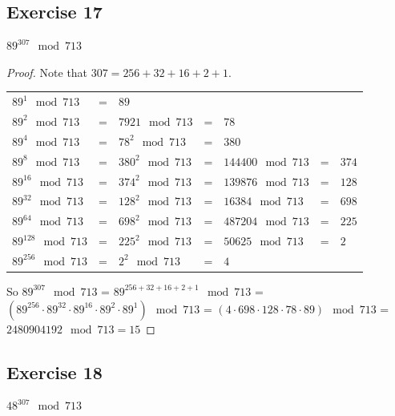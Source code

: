 \documentclass[14pt]{extarticle}
\begin{document}
\subsection{Exercise 17}
\(89^{307} \mod 713\)

\begin{proof}
Note that \(307 = 256 + 32 + 16 + 2 + 1\).

\begin{tabular}{lclclcl}
\(89^1 \mod 713\) & = & \(89\) \\
\(89^2 \mod 713\) & = & \(7921 \mod 713\) & = & \(78\)\\
\(89^4 \mod 713\) & = & \(78^2 \mod 713\) & = & \(380\) \\
\(89^8 \mod 713\) & = & \(380^2 \mod 713\) & = & \(144400 \mod 713\) & = & \(374\) \\
\(89^{16} \mod 713\) & = & \(374^2 \mod 713\) & = & \(139876 \mod 713\) & = & \(128\) \\
\(89^{32} \mod 713\) & = & \(128^2 \mod 713\) & = & \(16384 \mod 713\) & = & \(698\) \\
\(89^{64} \mod 713\) & = & \(698^2 \mod 713\) & = & \(487204 \mod 713\) & = & \(225\) \\
\(89^{128} \mod 713\) & = & \(225^2 \mod 713\) & = & \(50625 \mod 713\) & = & \(2\) \\
\(89^{256} \mod 713\) & = & \(2^2 \mod 713\) & = & \(4\)
\end{tabular}

So \(89^{307} \mod 713\) = \(89^{256 + 32 + 16 + 2 + 1} \mod 713\) = \((89^{256} \cdot 89^{32} \cdot 89^{16} 
\cdot 89^{2} \cdot 89^{1}) \mod 713\) = \((4 \cdot 698 \cdot 128 \cdot 78 \cdot 89) \mod 713\) = \(2480904192 \mod 
713 = 15\)
\end{proof}

\subsection{Exercise 18}
\(48^{307} \mod 713\)
\end{document}

